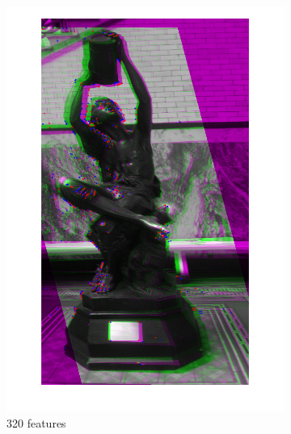 \documentclass{article}
\begin{document}
\begin{figure}[h]
\begin{subfigure}[b]{0.3\textwidth}
    	\includegraphics[width=\textwidth]{figures/alignment/fused_320_features_16_iterations}
    	\caption{320 features}
    \end{subfigure}
    \begin{subfigure}[b]{0.3\textwidth}
    	\centering

\end{subfigure}
\end{figure}
\end{document}
